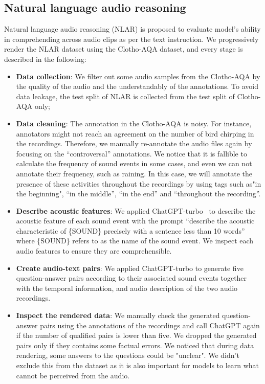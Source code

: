 \documentclass{article} %
\begin{document}
\subsection{Natural language audio reasoning} \label{appendix:nlar}
Natural language audio reasoning (NLAR) is proposed to evaluate model's ability in comprehending across audio clips as per the text instruction. We progressively render the NLAR dataset using the Clotho-AQA dataset, and every stage is described in the following:
\begin{itemize}
    \item \textbf{Data collection}: We filter out some audio samples from the Clotho-AQA by the quality of the audio and the understandably of the annotations. To avoid data leakage, the test split of NLAR is collected from the test split of Clotho-AQA only;
    \item \textbf{Data cleaning}: The annotation in the Clotho-AQA is noisy. For instance, annotators might not reach an agreement on the number of bird chirping in the recordings. Therefore, we manually re-annotate the audio files again by focusing on the ``controversal'' annotations. We notice that it is fallible to calculate the frequency of sound events in some cases, and even we can not annotate their frequency, such as raining. In this case, we will annotate the presence of these activities throughout the recordings by using tags such as"in the beginning", ``in the middle'', ``in the end''  and ``throughout the recording''.
    \item \textbf{Describe acoustic features}: We applied ChatGPT-turbo~\citep{openai_gpt-4_2023} to describe the acoustic feature of each sound event with the prompt ``describe the acoustic characteristic of \{SOUND\} precisely with a sentence less than 10 words'' where \{SOUND\} refers to as the name of the sound event. We inspect each audio features to ensure they are comprehensible.
    \item  \textbf{Create audio-text pairs}: We applied ChatGPT-turbo to generate five question-answer pairs according to their associated sound events together with the temporal information, and audio description of the two audio recordings.
    \item \textbf{Inspect the rendered data}: We manually check the generated question-answer pairs using the annotations of the recordings and call ChatGPT again if the number of qualified pairs is lower than five. We dropped the generated pairs only if they contains some factual errors. We noticed that during data rendering, some answers to the questions could be "unclear". We didn't exclude this from the dataset as it is also important for models to learn what cannot be perceived from the audio. 
\end{itemize}
\end{document}
